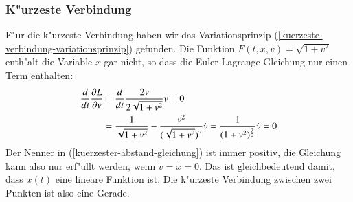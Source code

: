 \subsubsection{K"urzeste Verbindung}
F"ur die k"urzeste Verbindung haben wir das Variationsprinzip
(\ref{kuerzeste-verbindung-variationsprinzip}) gefunden.
Die Funktion $F(t,x,v)=\sqrt{1+v^2}$ enth"alt die Variable
$x$ gar nicht, so dass die Euler-Lagrange-Gleichung nur einen Term
enthalten:
\begin{align}
\frac{d}{dt}\frac{\partial L}{\partial v}
&=\frac{d}{dt}\frac{2v}{2\sqrt{1+v^2}}\dot v =0
\notag
\\
&=\frac1{\sqrt{1+v^2}} - \frac{v^2}{(\sqrt{1+v^2})^3}\dot v
=\frac1{(1+v^2)^{\frac32}}\dot v=0
\label{kuerzester-abstand-gleichung}
\end{align}
Der Nenner in (\ref{kuerzester-abstand-gleichung}) ist immer
positiv, die Gleichung kann also nur erf"ullt werden, wenn
$\dot v =\ddot x=0$. Das ist gleichbedeutend damit, dass 
$x(t)$ eine lineare Funktion ist.
Die k"urzeste Verbindung zwischen zwei Punkten ist also eine
Gerade.

